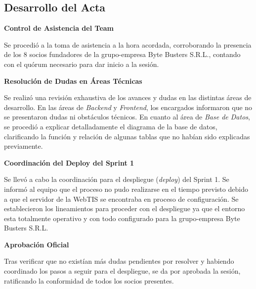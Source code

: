 \newpage
\subsection{Desarrollo del Acta}

\noindent \textbf{Control de Asistencia del Team}\par
Se procedió a la toma de asistencia a la hora acordada, corroborando la presencia de los 8 socios fundadores de la grupo-empresa Byte Busters S.R.L., contando con el quórum necesario para dar inicio a la sesión.

\vspace*{0.5cm}
\noindent \textbf{Resolución de Dudas en Áreas Técnicas}\par
Se realizó una revisión exhaustiva de los avances y dudas en las distintas áreas de desarrollo. En las áreas de \textit{Backend} y \textit{Frontend}, los encargados informaron que no se presentaron dudas ni obstáculos técnicos. En cuanto al área de \textit{Base de Datos}, se procedió a explicar detalladamente el diagrama de la base de datos, clarificando la función y relación de algunas tablas que no habían sido explicadas previamente.

\vspace*{0.5cm}
\noindent \textbf{Coordinación del Deploy del Sprint 1}\par
Se llevó a cabo la coordinación para el despliegue (\textit{deploy}) del Sprint 1. Se informó al equipo que el proceso no pudo realizarse en el tiempo previsto debido a que el servidor de la WebTIS se encontraba en proceso de configuración. Se establecieron los lineamientos para proceder con el despliegue ya que el entorno esta totalmente operativo y con todo configurado para la grupo-empresa Byte Busters S.R.L.

\vspace*{0.5cm}
\noindent \textbf{Aprobación Oficial}\par
Tras verificar que no existían más dudas pendientes por resolver y habiendo coordinado los pasos a seguir para el despliegue, se da por aprobada la sesión, ratificando la conformidad de todos los socios presentes.

